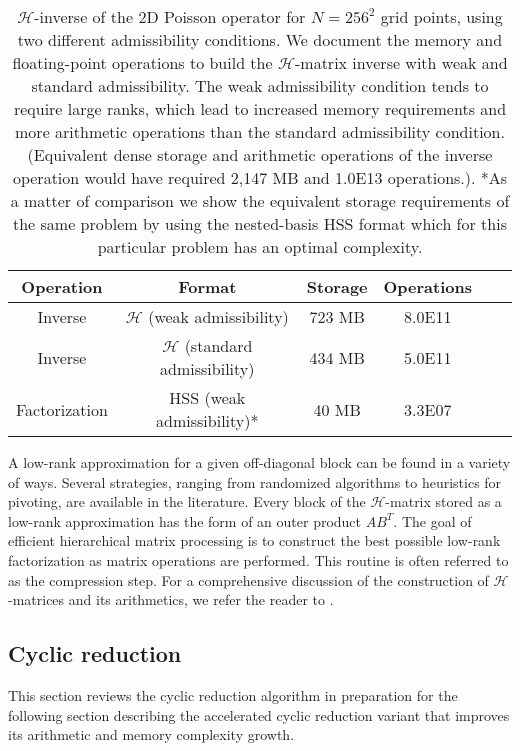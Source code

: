 \documentclass[]{elsarticle}
\begin{document}
\begin{table}[H]
\centering
\begin{tabular}{|c|c|c|c|c|c|}
\hline
Operation & Format & Storage &  Operations \\ \hline
Inverse & $\mathcal{H}$ (weak admissibility)         & 723 MB  &       8.0E11              \\ \hline
Inverse & $\mathcal{H}$ (standard admissibility)     & 434 MB  &       5.0E11              \\ \hline
Factorization & HSS (weak admissibility)*    & 40 MB  &       3.3E07              \\ \hline
\end{tabular}
\caption{$\mathcal{H}$-inverse of the 2D Poisson operator for $N=256^2$ grid points, using two different admissibility conditions. We document the memory and floating-point operations to build the $\mathcal{H}$-matrix inverse with weak and standard admissibility. The weak admissibility condition tends to require large ranks, which lead to increased memory requirements and more arithmetic operations than the standard admissibility condition. (Equivalent dense storage and arithmetic operations of the inverse operation would have required 2,147 MB and 1.0E13 operations.). *As a matter of comparison we show the equivalent storage requirements of the same problem by using the nested-basis HSS format which for this particular problem has an optimal complexity.}
\label{table:flopsTable}
\end{table}

A low-rank approximation for a given off-diagonal block can be found in a variety of ways. Several strategies, ranging from randomized algorithms to heuristics for pivoting, are available in the literature.  Every block of the $\mathcal{H}$-matrix stored as a low-rank approximation has the form of an outer product $AB^T$. The goal of efficient hierarchical matrix processing is to construct the best possible low-rank factorization as matrix operations are performed. This routine is often referred to as the compression step. For a comprehensive discussion of the construction of $\mathcal{H}$-matrices and its arithmetics, we refer the reader to \cite{hackbusch2015hierarchical}.

\subsection{Cyclic reduction}
\label{cyclic_reduction}

This section reviews the cyclic reduction algorithm in preparation for the following section describing the accelerated cyclic reduction variant that improves its arithmetic and memory complexity growth.
\end{document}
